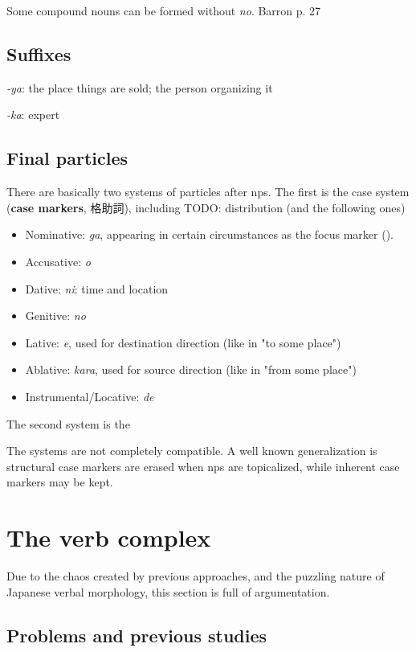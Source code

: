 \documentclass[UTF8, a4paper, oneside, scheme=plain]{ctexart}
\newcommand*{\concept}[1]{\textbf{#1}}
\newcommand{\corpus}[1]{\emph{#1}}
\begin{document}
Some compound nouns can be formed without \corpus{no}.
Barron p. 27

\subsection{Suffixes}

\corpus{-ya}: the place things are sold; the person organizing it

\corpus{-ka}: expert

\subsection{Final particles}

There are basically two systems of particles after \ac{np}s.
The first is the case system (\concept{case markers}, 格助詞), including
TODO: distribution (and the following ones)
\begin{itemize}
    \item Nominative: \corpus{ga}, 
    appearing in certain circumstances as the focus marker ().
    \item Accusative: \corpus{o}
    \item Dative: \corpus{ni}: time and location 
    \item Genitive: \corpus{no} 
    \item Lative: \corpus{e}, used for destination direction (like in "to some place")
    \item Ablative: \corpus{kara}, used for source direction (like in "from some place")
    \item Instrumental/Locative: \corpus{de}
\end{itemize}

The second system is the 

The systems are not completely compatible.
A well known generalization is structural case markers are erased when \ac{np}s are topicalized,
while inherent case markers may be kept.


\section{The verb complex}

Due to the chaos created by previous approaches,
and the puzzling nature of Japanese verbal morphology,
this section is full of argumentation.

\subsection{Problems and previous studies}\label{sec:verb-complex-overview}
\end{document}
